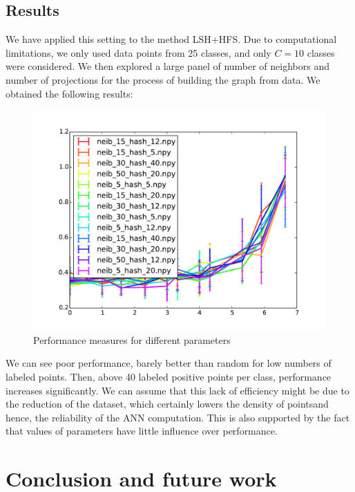\documentclass{article} %
\begin{document}
\subsection{Results}
We have applied this setting to the method LSH+HFS. Due to computational limitations, we only used data points from 25 classes, and only $C=10$ classes were considered. We then explored a large panel of number of neighbors and number of projections for the process of building the graph from data. We obtained the following results:

\begin{figure}[H]
\centering
\includegraphics[width=1.1\textwidth]{parameter_space_lsh.pdf}
\caption{Performance measures for different parameters}
\label{variation}
\end{figure}

We can see poor performance, barely better than random for low numbers of labeled points. Then, above 40 labeled positive points per class, performance increases significantly. We can assume that this lack of efficiency might be due to the reduction of the dataset, which certainly lowers the density of pointsand hence, the reliability of the ANN computation. This is also supported by the fact that values of parameters have little influence over performance.
\section{Conclusion and future work}
\end{document}
